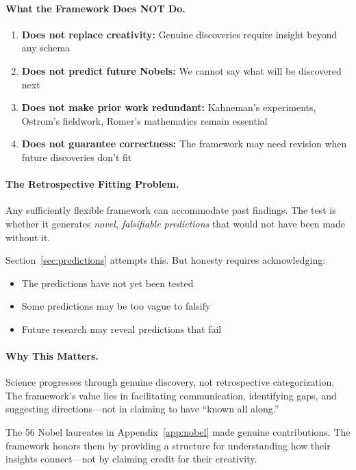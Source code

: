 \documentclass[12pt,a4paper]{article}
\begin{document}
\paragraph{What the Framework Does NOT Do.}
\begin{enumerate}
  \item \textbf{Does not replace creativity:} Genuine discoveries require insight
        beyond any schema
  \item \textbf{Does not predict future Nobels:} We cannot say what will be 
        discovered next
  \item \textbf{Does not make prior work redundant:} Kahneman's experiments,
        Ostrom's fieldwork, Romer's mathematics remain essential
  \item \textbf{Does not guarantee correctness:} The framework may need revision
        when future discoveries don't fit
\end{enumerate}

\paragraph{The Retrospective Fitting Problem.}
Any sufficiently flexible framework can accommodate past findings.
The test is whether it generates \emph{novel, falsifiable predictions}
that would not have been made without it.

Section~\ref{sec:predictions} attempts this. But honesty requires acknowledging:
\begin{itemize}
  \item The predictions have not yet been tested
  \item Some predictions may be too vague to falsify
  \item Future research may reveal predictions that fail
\end{itemize}

\paragraph{Why This Matters.}
Science progresses through genuine discovery, not retrospective categorization.
The framework's value lies in facilitating communication, identifying gaps,
and suggesting directions---not in claiming to have ``known all along.''

The 56 Nobel laureates in Appendix~\ref{app:nobel} made genuine contributions.
The framework honors them by providing a structure for understanding how their
insights connect---not by claiming credit for their creativity.
\end{document}
